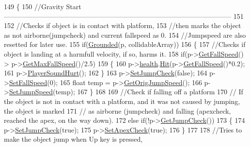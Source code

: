 \begin{DoxyCode}
149 \{
150     \textcolor{comment}{//Gravity
       Start-----------------------------------------------------------------------------------------------------}
151 
152     \textcolor{comment}{//Checks if object is in contact with platform,}
153     \textcolor{comment}{//then marks the object as not airborne(jumpcheck) and current fallspeed as 0.}
154     \textcolor{comment}{//Jumpspeed are also resetted for later use.}
155     \textcolor{keywordflow}{if}(\hyperlink{classPhysics_aba2e0af80edf40eb938413c3f5b84dbf}{Grounded}(p, collidableArray))
156     \{
157         \textcolor{comment}{//Checks if object is landing at a harmfull velocity, if so, harms it.}
158         \textcolor{keywordflow}{if}(p->\hyperlink{classPlayerObject_a5f93613a07676e31931780ae1b64965a}{GetFallSpeed}() > p->\hyperlink{classPlayerObject_a980dabd2d14fa5583ed08d9f6349270f}{GetMaxFallSpeed}()/2.5)
159         \{
160             p->\hyperlink{classPlayerObject_ad09efd50cf54cefed3250636a2fb1013}{health}.\hyperlink{classHealth_a565eec980a98122472e88c57e43b9f16}{Hit}(p->\hyperlink{classPlayerObject_a5f93613a07676e31931780ae1b64965a}{GetFallSpeed}()*0.2);
161             p->\hyperlink{classPlayerObject_aca6d9328e3f55987fbe4762c10b893b2}{PlayerSoundHurt}();
162         \}
163         p->\hyperlink{classPlayerObject_a1084ab4b57deee26ae98a131be9fb9ad}{SetJumpCheck}(\textcolor{keyword}{false});
164         p->\hyperlink{classPlayerObject_a4b3506e5454430af8634eecda17a9f70}{SetFallSpeed}(0);
165         \textcolor{keywordtype}{float} temp = p->\hyperlink{classPlayerObject_a45b90f5407670b9bc79e9fb5b5618541}{GetOrigJumpSpeed}();
166         p->\hyperlink{classPlayerObject_a9fcbe47e9d0cb21d6eae498280087076}{SetJumpSpeed}(temp);
167     \}
168 
169         \textcolor{comment}{//Check if falling off a platform}
170         \textcolor{comment}{// If the object is not in contact with a platform, and it was not caused by jumping, the object is
       marked}
171         \textcolor{comment}{// as airborne (jumpcheck) and falling (apexcheck, reached the apex, on the way down).}
172     \textcolor{keywordflow}{else} \textcolor{keywordflow}{if}(!p->\hyperlink{classPlayerObject_a203e254033dbe429d05f6c022994a824}{GetJumpCheck}())
173     \{
174         p->\hyperlink{classPlayerObject_a1084ab4b57deee26ae98a131be9fb9ad}{SetJumpCheck}(\textcolor{keyword}{true});
175         p->\hyperlink{classPlayerObject_a6cd0c1faaf0d2cd1749d11a7e9e20ff8}{SetApexCheck}(\textcolor{keyword}{true});
176     \}
177 
178     \textcolor{comment}{//Tries to make the object jump when Up key is pressed,}

\end{DoxyCode}
